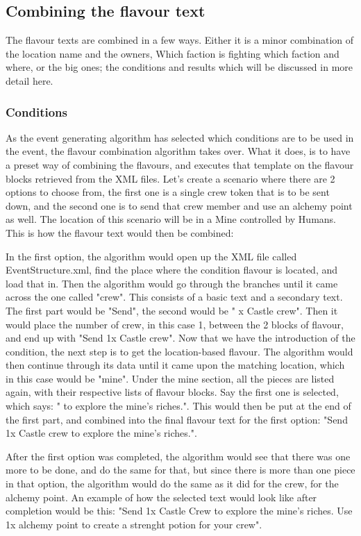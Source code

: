 \subsection{Combining the flavour text}
The flavour texts are combined in a few ways. Either it is a minor combination of the location name and the owners, Which faction is fighting which faction and where, or the big ones; the conditions and results which will be discussed in more detail here.
\subsubsection{Conditions}
As the event generating algorithm has selected which conditions are to be used in the event, the flavour combination algorithm takes over. What it does, is to have a preset way of combining the flavours, and executes that template on the flavour blocks retrieved from the XML files. Let's create a scenario where there are 2 options to choose from, the first one is a single crew  token that is to be sent down, and the second one is to send that crew member and use an alchemy point as well. The location of this scenario will be in a Mine controlled by Humans.
This is how the flavour text would then be combined:

In the first option, the algorithm would open up the XML file called EventStructure.xml, find the place where the condition flavour is located, and load that in. Then the algorithm would go through the branches until it came across the one called "crew". This consists of a basic text and a secondary text. The first part would be "Send", the second would be " x Castle crew". Then it would place the number of crew, in this case 1, between the 2 blocks of flavour, and end up with "Send 1x Castle crew".
Now that we have the introduction of the condition, the next step is to get the location-based flavour. The algorithm would then continue through its data until it came upon the matching location, which in this case would be "mine". Under the mine section, all the pieces are listed again, with their respective lists of flavour blocks. Say the first one is selected, which says: " to explore the mine's riches.". This would then be put at the end of the first part, and combined into the final flavour text for the first option: "Send 1x Castle crew to explore the mine's riches.".

After the first option was completed, the algorithm would see that there was one more to be done, and do the same for that, but since there is more than one piece in that option, the algorithm would do the same as it did for the crew, for the alchemy point.
An example of how the selected text would look like after completion would be this: "Send 1x Castle Crew to explore the mine's riches. Use 1x alchemy point to create a strenght potion for your crew".

